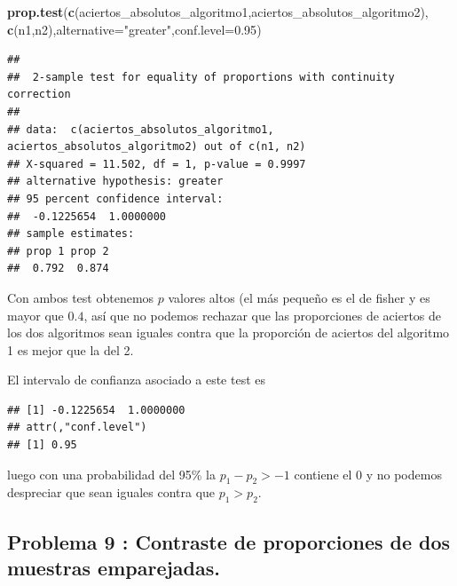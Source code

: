 \documentclass[
]{article}
\newenvironment{Shaded}{\begin{snugshade}}{\end{snugshade}}
\newcommand{\DataTypeTok}[1]{\textcolor[rgb]{0.13,0.29,0.53}{#1}}
\newcommand{\FloatTok}[1]{\textcolor[rgb]{0.00,0.00,0.81}{#1}}
\newcommand{\KeywordTok}[1]{\textcolor[rgb]{0.13,0.29,0.53}{\textbf{#1}}}
\newcommand{\NormalTok}[1]{#1}
\newcommand{\OperatorTok}[1]{\textcolor[rgb]{0.81,0.36,0.00}{\textbf{#1}}}
\newcommand{\StringTok}[1]{\textcolor[rgb]{0.31,0.60,0.02}{#1}}
\begin{document}
\begin{Shaded}
\begin{Highlighting}[]
\KeywordTok{prop.test}\NormalTok{(}\KeywordTok{c}\NormalTok{(aciertos\_absolutos\_algoritmo1,aciertos\_absolutos\_algoritmo2), }\KeywordTok{c}\NormalTok{(n1,n2),}\DataTypeTok{alternative=}\StringTok{"greater"}\NormalTok{,}\DataTypeTok{conf.level=}\FloatTok{0.95}\NormalTok{)}
\end{Highlighting}
\end{Shaded}

\begin{verbatim}
## 
##  2-sample test for equality of proportions with continuity correction
## 
## data:  c(aciertos_absolutos_algoritmo1, aciertos_absolutos_algoritmo2) out of c(n1, n2)
## X-squared = 11.502, df = 1, p-value = 0.9997
## alternative hypothesis: greater
## 95 percent confidence interval:
##  -0.1225654  1.0000000
## sample estimates:
## prop 1 prop 2 
##  0.792  0.874
\end{verbatim}

Con ambos test obtenemos \(p\) valores altos (el más pequeño es el de
fisher y es mayor que \(0.4\), así que no podemos rechazar que las
proporciones de aciertos de los dos algoritmos sean iguales contra que
la proporción de aciertos del algoritmo 1 es mejor que la del 2.

El intervalo de confianza asociado a este test es

\begin{Shaded}
\end{Shaded}

\begin{verbatim}
## [1] -0.1225654  1.0000000
## attr(,"conf.level")
## [1] 0.95
\end{verbatim}

luego con una probabilidad del 95\% la \(p_1-p_2> -1\) contiene el 0 y
no podemos despreciar que sean iguales contra que \(p_1>p_2.\)

\hypertarget{problema-9-contraste-de-proporciones-de-dos-muestras-emparejadas.}{%
\subsection{Problema 9 : Contraste de proporciones de dos muestras
emparejadas.}\label{problema-9-contraste-de-proporciones-de-dos-muestras-emparejadas.}}
\end{document}
